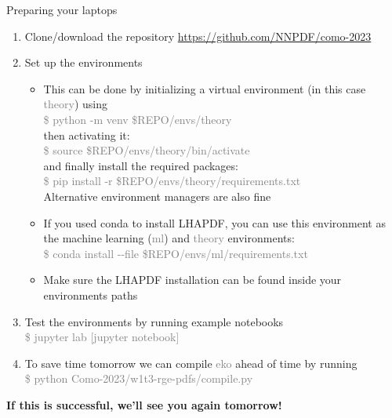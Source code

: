 \documentclass[9pt,t]{beamer}
\begin{document}
\begin{frame}[containsverbatim]{Preparing your laptops}
  \begin{enumerate}
    \item Clone/download the repository \url{https://github.com/NNPDF/como-2023}
    \item Set up the environments
    \begin{itemize}
      \item This can be done by initializing a virtual environment (in this case \textcolor{gray}{theory}) using\\
      \hspace*{0.5cm}\textcolor{gray}{\$ python -m venv \$REPO/envs/theory} \\
      then activating it: \\ 
      \hspace*{0.5cm}\textcolor{gray}{\$ source \$REPO/envs/theory/bin/activate} \\
      and finally install the required packages: \\
      \hspace*{0.5cm}\textcolor{gray}{\$ pip install -r \$REPO/envs/theory/requirements.txt} \\
      Alternative environment managers are also fine
      \item If you used conda to install LHAPDF, you can use this environment as the machine learning (\textcolor{gray}{ml}) and \textcolor{gray}{theory} environments: \\
      \hspace*{0.5cm}\textcolor{gray}{\$ conda install -{}-file \$REPO/envs/ml/requirements.txt}
      \item Make sure the LHAPDF installation can be found inside your environments paths
    \end{itemize}
    \item Test the environments by running example notebooks \\
    \hspace*{0.5cm}\textcolor{gray}{\$ jupyter lab [jupyter notebook]}
    \item To save time tomorrow we can compile \textcolor{gray}{eko} ahead of time by running \\
    \hspace*{0.5cm}\textcolor{gray}{\$ python Como-2023/w1t3-rge-pdfs/compile.py}

  \end{enumerate}
  \vspace*{0.6cm}
  \begin{center}
    \textbf{If this is successful, we'll see you again tomorrow!}
  \end{center}
\end{frame}
\end{document}

